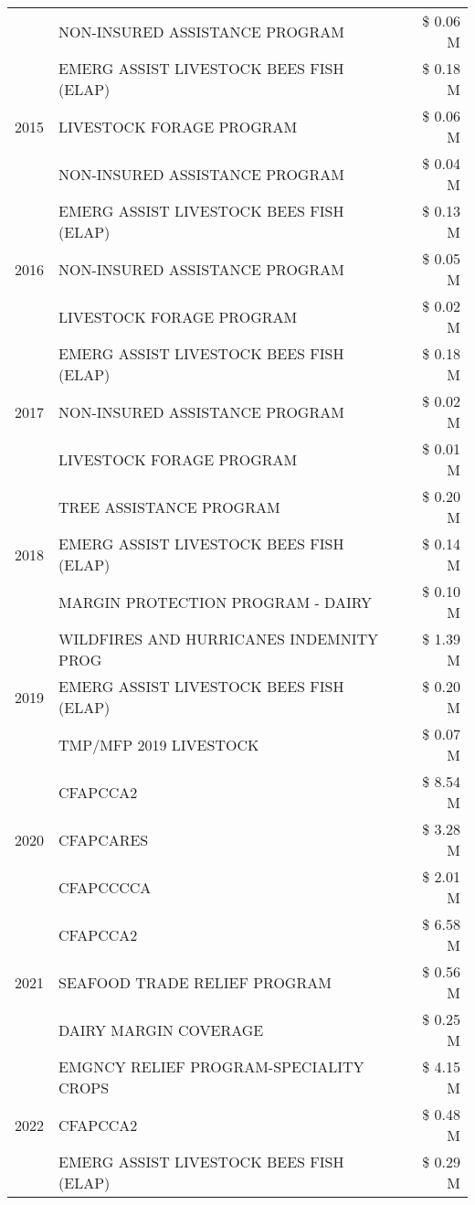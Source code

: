 \begin{tabular}{llr}
 & NON-INSURED ASSISTANCE PROGRAM & \$ 0.06 M \\
\cline{1-3}
\multirow[t]{3}{*}{2015} & EMERG ASSIST LIVESTOCK BEES FISH (ELAP) & \$ 0.18 M \\
 & LIVESTOCK FORAGE PROGRAM & \$ 0.06 M \\
 & NON-INSURED ASSISTANCE PROGRAM & \$ 0.04 M \\
\cline{1-3}
\multirow[t]{3}{*}{2016} & EMERG ASSIST LIVESTOCK BEES FISH (ELAP) & \$ 0.13 M \\
 & NON-INSURED ASSISTANCE PROGRAM & \$ 0.05 M \\
 & LIVESTOCK FORAGE PROGRAM & \$ 0.02 M \\
\cline{1-3}
\multirow[t]{3}{*}{2017} & EMERG ASSIST LIVESTOCK BEES FISH (ELAP) & \$ 0.18 M \\
 & NON-INSURED ASSISTANCE PROGRAM & \$ 0.02 M \\
 & LIVESTOCK FORAGE PROGRAM & \$ 0.01 M \\
\cline{1-3}
\multirow[t]{3}{*}{2018} & TREE ASSISTANCE PROGRAM & \$ 0.20 M \\
 & EMERG ASSIST LIVESTOCK BEES FISH (ELAP) & \$ 0.14 M \\
 & MARGIN PROTECTION PROGRAM - DAIRY & \$ 0.10 M \\
\cline{1-3}
\multirow[t]{3}{*}{2019} & WILDFIRES AND HURRICANES INDEMNITY PROG & \$ 1.39 M \\
 & EMERG ASSIST LIVESTOCK BEES FISH (ELAP) & \$ 0.20 M \\
 & TMP/MFP 2019 LIVESTOCK & \$ 0.07 M \\
\cline{1-3}
\multirow[t]{3}{*}{2020} & CFAPCCA2 & \$ 8.54 M \\
 & CFAPCARES & \$ 3.28 M \\
 & CFAPCCCCA & \$ 2.01 M \\
\cline{1-3}
\multirow[t]{3}{*}{2021} & CFAPCCA2 & \$ 6.58 M \\
 & SEAFOOD TRADE RELIEF PROGRAM & \$ 0.56 M \\
 & DAIRY MARGIN COVERAGE & \$ 0.25 M \\
\cline{1-3}
\multirow[t]{3}{*}{2022} & EMGNCY RELIEF PROGRAM-SPECIALITY CROPS & \$ 4.15 M \\
 & CFAPCCA2 & \$ 0.48 M \\
 & EMERG ASSIST LIVESTOCK BEES FISH (ELAP) & \$ 0.29 M \\
\cline{1-3}
\bottomrule
\end{tabular}
